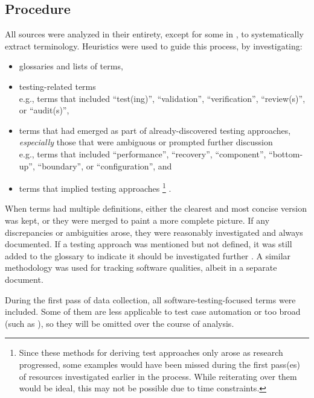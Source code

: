 \subsection{Procedure}

All sources were analyzed in their entirety, except for some in
, to systematically extract terminology.
Heuristics were used to guide this process, by investigating:

\begin{itemize}
      \item glossaries and lists of terms,
      \item testing-related terms\\
            e.g., terms that included ``test(ing)'', ``validation'',
            ``verification'', ``review(s)'', or ``audit(s)'',
      \item terms that had emerged as part of already-discovered
            testing approaches, \emph{especially} those that were ambiguous
            or prompted further discussion\\
            e.g., terms that included ``performance'', ``recovery'',
            ``component'', ``bottom-up'', ``boundary'', or ``configuration'', and
      \item terms that implied testing approaches%
            \ifnotpaper\footnote{
                        Since these methods for deriving test approaches only arose
                        as research progressed, some examples would have been missed
                        during the first pass(es) of resources investigated earlier
                        in the process. While reiterating over them would be ideal,
                        this may not be possible due to time constraints.
                  }\fi%
            .
\end{itemize}

When terms had multiple definitions, either the clearest and most concise
version was kept, or they were merged to paint a more complete picture.
If any discrepancies or ambiguities
arose, they were reasonably investigated and always documented. If a
testing approach was mentioned but not defined, it was still added to the
glossary to indicate it should be investigated further%
. A similar methodology
was used for tracking software qualities, albeit in a separate
document.

During the first pass of data collection, all software-testing-focused terms
were included. Some of them are less applicable to test case automation
\fi or too
broad (such as \fi), so they
will be omitted over the course of analysis.

